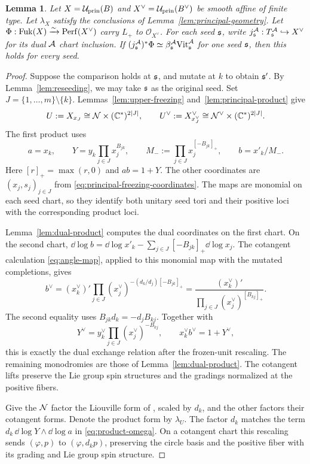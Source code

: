 \documentclass[12pt, letter]{amsart}
\newtheorem{lemma}[theorem]{Lemma}
\theoremstyle{definition}
\newcommand{\OO}{\mathcal O}
\newcommand{\Nn}{\mathcal N}
\newcommand{\pr}{\mathrm{prin}}
\numberwithin{equation}{section}
\begin{document}
\begin{lemma}\label{lem:one-seed-hms}
Let $X=\cU_{\pr}(B)$ and $X^\vee=\cU_{\pr}(B^\vee)$ be smooth affine
of finite type. Let $\lambda_X$ satisfy the conclusions of
Lemma~\ref{lem:principal-geometry}.
Let $\Phi:\operatorname{Fuk}(X)\xrightarrow{\sim}\mathrm{Perf}(X^\vee)$ carry $L_+$ to $\OO_{X^\vee}$.
For each seed $\mathfrak{s}$, write $j_{\mathfrak{s}}^{\mathcal{A}}:T_{\mathfrak{s}}^{\mathcal{A}}\hookrightarrow X^\vee$
for its dual $\mathcal{A}$ chart inclusion.
If $(j_{\mathfrak{s}}^{\mathcal{A}})^*\Phi\simeq\beta_{\mathfrak{s}}^{\mathcal{A}}\mathrm{Vit}_{\mathfrak{s}}^{\mathcal{A}}$ for one seed $\mathfrak{s}$,
then this holds for every seed.
\end{lemma}
\begin{proof}
Suppose the comparison holds at $\mathfrak{s}$, and mutate at $k$ to obtain $\mathfrak{s}'$.
By Lemma~\ref{lem:reseeding}, we may take $\mathfrak{s}$ as the original seed.
Set $J=\{1,\ldots,m\}\setminus\{k\}$.
Lemmas~\ref{lem:upper-freezing} and~\ref{lem:principal-product} give
\[
 U:=X_{x_J}\cong\Nn\times(\C^*)^{2|J|},\qquad
 U^\vee:=X^\vee_{x_J^\vee}\cong\Nn^\vee\times(\C^*)^{2|J|}.
\]
The first product uses
\[
 a=x_k,\qquad Y=y_k\prod_{j\in J}x_j^{B_{jk}},\qquad
 M_-:=\prod_{j\in J}x_j^{[-B_{jk}]_+},\qquad b=x'_k/M_-.
\]
Here $[r]_+=\max(r,0)$ and $ab=1+Y$.
The other coordinates are $(x_j,s_j)_{j\in J}$ from
\eqref{eq:principal-freezing-coordinates}.
The maps are monomial on each seed chart, so they identify both
unitary seed tori and their positive loci with the corresponding product loci.

Lemma~\ref{lem:dual-product} computes the dual coordinates on the first chart.
On the second chart, $\dd\log b=\dd\log x'_k-\sum_{j\in J}[-B_{jk}]_+\dd\log x_j$.
The cotangent calculation \eqref{eq:angle-map}, applied to this monomial map
with the mutated completions, gives
\[
 b^\vee=(x_k^\vee)'\prod_{j\in J}
 (x_j^\vee)^{-(d_k/d_j)[-B_{jk}]_+}
 =\frac{(x_k^\vee)'}{\prod_{j\in J}(x_j^\vee)^{[B_{kj}]_+}}.
\]
The second equality uses $B_{jk}d_k=-d_jB_{kj}$.
Together with
\[
 Y^\vee=y_k^\vee\prod_{j\in J}(x_j^\vee)^{-B_{kj}},\qquad
 x_k^\vee b^\vee=1+Y^\vee,
\]
this is exactly the dual exchange relation after the frozen-unit rescaling.
The remaining monodromies are those of Lemma~\ref{lem:dual-product}.
The cotangent lifts preserve the Lie group spin structures and the gradings
normalized at the positive fibers.

Give the $\mathcal{N}$ factor the Liouville form of \cite[Lemma~4.7]{HS}, scaled by $d_k$, and the other factors their
cotangent forms. Denote the product form by $\lambda_U$.
The factor $d_k$ matches the term $d_k\,\dd\log Y\wedge\dd\log a$
in \eqref{eq:product-omega}.
On a cotangent chart this rescaling sends $(\varphi,p)$ to $(\varphi,d_kp)$,
preserving the circle basis and the positive fiber with its grading and Lie group spin structure.


\end{proof}
\end{document}
